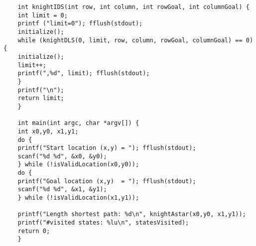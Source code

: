 \documentclass{article}
\begin{document}
\begin{lstlisting}
	int knightIDS(int row, int column, int rowGoal, int columnGoal) {
	int limit = 0;
	printf ("limit=0"); fflush(stdout);
	initialize();
	while (knightDLS(0, limit, row, column, rowGoal, columnGoal) == 0) {
	initialize();
	limit++;
	printf(",%d", limit); fflush(stdout);
	}
	printf("\n");
	return limit;
	}
	
	int main(int argc, char *argv[]) {
	int x0,y0, x1,y1;
	do {
	printf("Start location (x,y) = "); fflush(stdout);
	scanf("%d %d", &x0, &y0);
	} while (!isValidLocation(x0,y0));
	do {
	printf("Goal location (x,y)  = "); fflush(stdout);
	scanf("%d %d", &x1, &y1);
	} while (!isValidLocation(x1,y1));
	
	printf("Length shortest path: %d\n", knightAstar(x0,y0, x1,y1));
	printf("#visited states: %lu\n", statesVisited);
	return 0;
	}
	\end{lstlisting}
	
\end{document}
